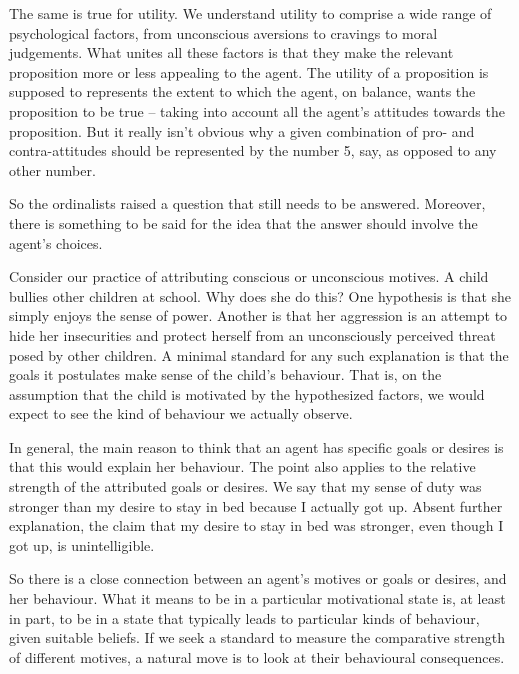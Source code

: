 The same is true for utility. We understand utility to comprise a wide range of
psychological factors, from unconscious aversions to cravings to moral
judgements. What unites all these factors is that they make the relevant
proposition more or less appealing to the agent. The utility of a proposition is
supposed to represents the extent to which the agent, on balance, wants the
proposition to be true -- taking into account all the agent's attitudes towards
the proposition. But it really isn't obvious why a given combination of pro- and
contra-attitudes should be represented by the number 5, say, as opposed to any
other number.

So the ordinalists raised a question that still needs to be answered.
Moreover, there is something to be said for the idea that the answer
should involve the agent's choices.

Consider our practice of attributing conscious or unconscious
motives. A child bullies other children at school. Why does she do
this? One hypothesis is that she simply enjoys the sense of
power. Another is that her aggression is an attempt to hide her
insecurities and protect herself from an unconsciously perceived
threat posed by  other children. A minimal standard for any such
explanation is that the goals it postulates make sense of the child's
behaviour. That is, on the assumption that the child is motivated by
the hypothesized factors, we would expect to see the kind of behaviour
we actually observe.

In general, the main reason to think that an agent has specific goals
or desires is that this would explain her behaviour. The point also
applies to the relative strength of the attributed goals or
desires. We say that my sense of duty was stronger than my desire to
stay in bed because I actually got up. Absent further explanation, the
claim that my desire to stay in bed was stronger, even though
I got up, is unintelligible.

So there is a close connection between an agent's motives or goals or
desires, and her behaviour. What it means to be in a particular
motivational state is, at least in part, to be in a state that
typically leads to particular kinds of behaviour, given suitable
beliefs. If we seek a standard to measure the comparative strength of
different motives, a natural move is to look at their
behavioural consequences.


